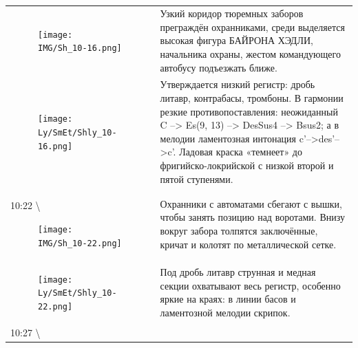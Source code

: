 \begin{longtable}[]{@{}ll@{}}
\begin{minipage}[t]{0.48\columnwidth}
\begin{figure}
\centering
\texttt{[image: IMG/Sh\_10-16.png]}
\caption{}
\end{figure}
\strut
\end{minipage} & \begin{minipage}[t]{0.48\columnwidth}\raggedright\strut
Узкий коридор тюремных заборов преграждён охранниками, среди
выделяется высокая фигура БАЙРОНА ХЭДЛИ, начальника охраны,
жестом командующего автобусу подъезжать ближе.\strut
\end{minipage}\tabularnewline
\begin{minipage}[t]{0.30\columnwidth}\raggedright\strut
\begin{figure}
\centering
\texttt{[image: Ly/SmEt/Shly\_10-16.png]}
\caption{}
\end{figure}
\strut
\end{minipage} & \begin{minipage}[t]{0.64\columnwidth}\raggedright\strut
Утверждается низкий регистр: дробь литавр, контрабасы,
тромбоны.
В гармонии резкие противопоставления: неожиданный C --\textgreater{}
Es(9, 13) --\textgreater{} DesSus4 --\textgreater{} Bsus2; а в мелодии ламентозная
интонация c'--\textgreater{}des'--\textgreater{}c'.
Ладовая краска «темнеет» до фригийско-локрийской с низкой
второй и пятой ступенями.\strut
\end{minipage}\tabularnewline
\begin{minipage}[t]{0.48\columnwidth}\raggedright\strut
10:22 \textbackslash{}

\begin{figure}
\centering
\texttt{[image: IMG/Sh\_10-22.png]}
\caption{}
\end{figure}
\strut
\end{minipage} & \begin{minipage}[t]{0.48\columnwidth}\raggedright\strut
Охранники с автоматами сбегают с вышки, чтобы занять
позицию над воротами. Внизу вокруг забора толпятся
заключённые, кричат и колотят по металлической сетке.\strut
\end{minipage}\tabularnewline
\begin{minipage}[t]{0.30\columnwidth}\raggedright\strut
\begin{figure}
\centering
\texttt{[image: Ly/SmEt/Shly\_10-22.png]}
\caption{}
\end{figure}
\strut
\end{minipage} & \begin{minipage}[t]{0.64\columnwidth}\raggedright\strut
Под дробь литавр струнная и медная секции
охватывают весь регистр, особенно яркие на краях:
в линии басов и ламентозной мелодии скрипок.\strut
\end{minipage}\tabularnewline
\begin{minipage}[t]{0.48\columnwidth}\raggedright\strut
10:27 \textbackslash{}


\end{minipage}
\end{longtable}

